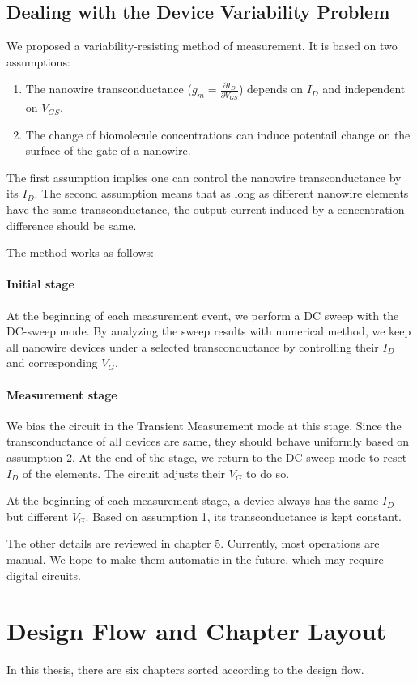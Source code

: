 \subsection*{Dealing with the Device Variability Problem} \label{section:twqAssumption}
We proposed a variability-resisting method of measurement.
It is based on two assumptions:
\begin{enumerate}
    \item The nanowire transconductance ($g_m = \frac{\partial I_D}{\partial V_{GS}}$) depends on $I_D$ and independent on $V_{GS}$.
    \item The change of biomolecule concentrations can induce potentail change on the surface of the gate of a nanowire.
\end{enumerate}
The first assumption implies one can control the nanowire transconductance by its $I_D$.
The second assumption means that as long as different nanowire elements have the same transconductance, the output current induced by a concentration difference should be same.

The method works as follows:

\paragraph*{Initial stage}
At the beginning of each measurement event, we perform a DC sweep with the DC-sweep mode.
By analyzing the sweep results with numerical method, we keep all nanowire devices under a selected transconductance by controlling their $I_D$ and corresponding $V_G$.

\paragraph*{Measurement stage}
We bias the circuit in the Transient Measurement mode at this stage.
Since the transconductance of all devices are same, they should behave uniformly based on assumption 2.
At the end of the stage, we return to the DC-sweep mode to reset $I_D$ of the elements.
The circuit adjusts their $V_G$ to do so.

At the beginning of each measurement stage, a device always has the same $I_D$ but different $V_G$.
Based on assumption 1, its transconductance is kept constant.

The other details are reviewed in chapter 5.
Currently, most operations are manual.
We hope to make them automatic in the future, which may require digital circuits.

\section{Design Flow and Chapter Layout}
In this thesis, there are six chapters sorted according to the design flow.

